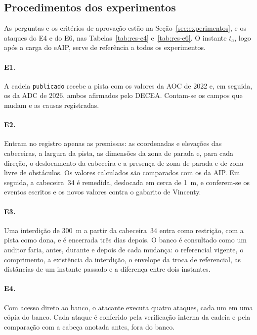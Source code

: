 \subsection{Procedimentos dos experimentos}\label{sec:procedimentos}

As perguntas e os critérios de aprovação estão na Seção~\ref{sec:experimentos}, e os ataques do E4 e do E6, nas Tabelas~\ref{tab:res-e4} e~\ref{tab:res-e6}. O instante $t_a$, logo após a carga do eAIP, serve de referência a todos os experimentos.

\paragraph*{E1.} A cadeia \texttt{publicado} recebe a pista com os valores da AOC de 2022 e, em seguida, os da ADC de 2026, ambos afirmados pelo DECEA. Contam-se os campos que mudam e as causas registradas.

\paragraph*{E2.} Entram no registro apenas as premissas: as coordenadas e elevações das cabeceiras, a largura da pista, as dimensões da zona de parada e, para cada direção, o deslocamento da cabeceira e a presença de zona de parada e de zona livre de obstáculos. Os valores calculados são comparados com os da AIP. Em seguida, a cabeceira~34 é remedida, deslocada em cerca de 1~m, e conferem-se os eventos escritos e os novos valores contra o gabarito de Vincenty.

\paragraph*{E3.} Uma interdição de 300~m a partir da cabeceira~34 entra como restrição, com a pista como dona, e é encerrada três dias depois. O banco é consultado como um auditor faria, antes, durante e depois de cada mudança: o referencial vigente, o comprimento, a existência da interdição, o envelope da troca de referencial, as distâncias de um instante passado e a diferença entre dois instantes.

\paragraph*{E4.} Com acesso direto ao banco, o atacante executa quatro ataques, cada um em uma cópia do banco. Cada ataque é conferido pela verificação interna da cadeia e pela comparação com a cabeça anotada antes, fora do banco.

